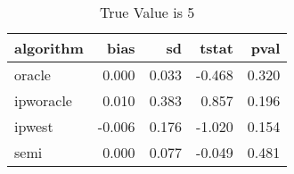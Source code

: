 \begin{table}[h!]
\caption{True Value is 5}
\centering
\begin{tabular}[t]{lrrrr}
\toprule
algorithm & bias & sd & tstat & pval\\
\midrule
oracle & 0.000 & 0.033 & -0.468 & 0.320\\
ipworacle & 0.010 & 0.383 & 0.857 & 0.196\\
ipwest & -0.006 & 0.176 & -1.020 & 0.154\\
semi & 0.000 & 0.077 & -0.049 & 0.481\\
\bottomrule
\end{tabular}
\end{table}
